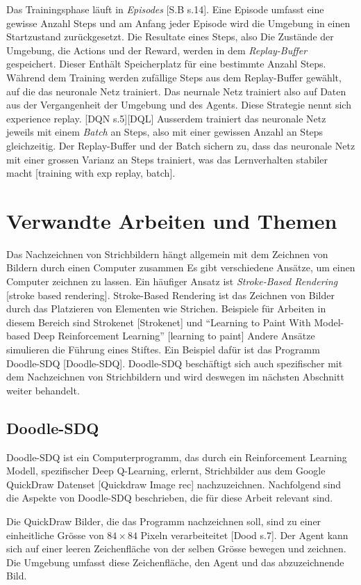 Das Trainingsphase läuft in \emph{Episodes} [S.B s.14]. Eine Episode umfasst
eine gewisse Anzahl Steps und am Anfang jeder Episode wird die Umgebung in einen
Startzustand zurückgesetzt. Die Resultate eines Steps, also Die Zustände der
Umgebung, die Actions und der Reward, werden in dem \emph{Replay-Buffer}
gespeichert. Dieser Enthält Speicherplatz für eine bestimmte Anzahl Steps.
Während dem Training werden zufällige Steps aus dem Replay-Buffer gewählt, auf
die das neuronale Netz trainiert. Das neurnale Netz trainiert also auf Daten aus
der Vergangenheit der Umgebung und des Agents. Diese Strategie nennt sich
experience replay. [DQN s.5][DQL] Ausserdem trainiert das neuronale Netz jeweils mit
einem \emph{Batch} an Steps, also mit einer gewissen Anzahl an Steps
gleichzeitig. Der Replay-Buffer und der Batch sichern zu, dass das neuronale
Netz mit einer grossen Varianz an Steps trainiert, was das Lernverhalten
stabiler macht [training with exp replay, batch].


\section{Verwandte Arbeiten und Themen}
\label{chap:t_verwandt}
Das Nachzeichnen von Strichbildern hängt allgemein mit dem Zeichnen von Bildern
durch einen Computer zusammen Es gibt verschiedene Ansätze, um einen Computer
zeichnen zu lassen. Ein häufiger Ansatz ist \emph{Stroke-Based Rendering}
[stroke based rendering]. Stroke-Based Rendering ist das Zeichnen von Bilder
durch das Platzieren von Elementen wie Strichen. Beispiele für Arbeiten in
diesem Bereich sind Strokenet [Strokenet] und ``Learning to Paint With
Model-based Deep Reinforcement Learning'' [learning to paint] Andere Ansätze
simulieren die Führung eines Stiftes. Ein Beispiel dafür ist das Programm
Doodle-SDQ [Doodle-SDQ]. Doodle-SDQ beschäftigt sich auch spezifischer mit dem
Nachzeichnen von Strichbildern und wird deswegen im nächsten Abschnitt weiter
behandelt.

\subsection*{Doodle-SDQ}
Doodle-SDQ ist ein Computerprogramm, das durch ein Reinforcement Learning
Modell, spezifischer Deep Q-Learning, erlernt, Strichbilder aus dem Google
QuickDraw Datenset [Quickdraw Image rec] nachzuzeichnen. Nachfolgend sind die Aspekte von Doodle-SDQ
beschrieben, die für diese Arbeit relevant sind.

Die QuickDraw Bilder, die das Programm nachzeichnen soll, sind zu einer
einheitliche Grösse von $84\times84$ Pixeln verarbeiteitet [Dood s.7]. Der Agent kann sich
auf einer leeren Zeichenfläche von der selben Grösse bewegen und zeichnen. Die
Umgebung umfasst diese Zeichenfläche, den Agent und das abzuzeichnende Bild.

